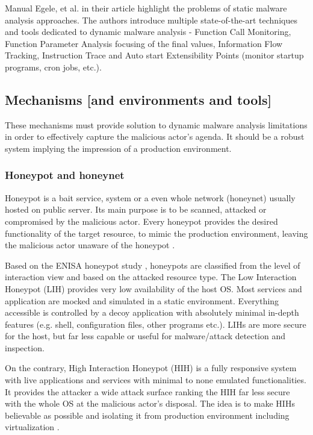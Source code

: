 Manual Egele, et al. in their article \cite{article:malware_analysis_techniques} highlight the problems of static malware analysis approaches. The authors introduce multiple state-of-the-art techniques and tools dedicated to dynamic malware analysis - Function Call Monitoring, Function Parameter Analysis focusing of the final values, Information Flow Tracking, Instruction Trace and Auto start Extensibility Points (monitor startup programs, cron jobs, etc.).

\subsection{Mechanisms [and environments and tools] \label{anal:malware:mech_envs}}
These mechanisms must provide solution to dynamic malware analysis limitations in order to effectively capture the malicious actor's agenda. It should be a robust system implying the impression of a production environment.

\subsubsection{Honeypot and honeynet \label{anal:malware:mech_envs:hons}}
Honeypot is a bait service, system or a even whole network (honeynet) usually hosted on public server. Its main purpose is to be scanned, attacked or compromised by the malicious actor. Every honeypot provides the desired functionality of the target resource, to mimic the production environment, leaving the malicious actor unaware of the honeypot \cite{study:enisa_honeypots}.

Based on the ENISA honeypot study \cite{study:enisa_honeypots}, honeypots are classified from the level of interaction view and based on the attacked resource type. The Low Interaction Honeypot (LIH) provides very low availability of the host OS. Most services and application are mocked and simulated in a static environment. Everything accessible is controlled by a decoy application with absolutely minimal in-depth features (e.g. shell, configuration files, other programs etc.). LIHs are more secure for the host, but far less capable or useful for malware/attack detection and inspection.

On the contrary, High Interaction Honeypot (HIH) is a fully responsive system with live applications and services with minimal to none emulated functionalities. It provides the attacker a wide attack surface ranking the HIH far less secure with the whole OS at the malicious actor's disposal. The idea is to make HIHs believable as possible and isolating it from production environment including virtualization \cite{blog:first_malware_analysis}.

